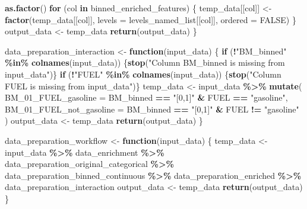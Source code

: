 \documentclass[
  english,
  11pt,
]{article}
\newenvironment{Shaded}{\begin{snugshade}}{\end{snugshade}}
\newcommand{\AttributeTok}[1]{\textcolor[rgb]{0.13,0.29,0.53}{#1}}
\newcommand{\ConstantTok}[1]{\textcolor[rgb]{0.56,0.35,0.01}{#1}}
\newcommand{\ControlFlowTok}[1]{\textcolor[rgb]{0.13,0.29,0.53}{\textbf{#1}}}
\newcommand{\FunctionTok}[1]{\textcolor[rgb]{0.13,0.29,0.53}{\textbf{#1}}}
\newcommand{\NormalTok}[1]{#1}
\newcommand{\OtherTok}[1]{\textcolor[rgb]{0.56,0.35,0.01}{#1}}
\newcommand{\SpecialCharTok}[1]{\textcolor[rgb]{0.81,0.36,0.00}{\textbf{#1}}}
\newcommand{\StringTok}[1]{\textcolor[rgb]{0.31,0.60,0.02}{#1}}
\begin{document}
\begin{Shaded}
\begin{Highlighting}[]
        \FunctionTok{as.factor}\NormalTok{()}
    \ControlFlowTok{for}\NormalTok{ (col }\ControlFlowTok{in}\NormalTok{ binned\_enriched\_features) \{}
\NormalTok{        temp\_data[[col]] }\OtherTok{\textless{}{-}} \FunctionTok{factor}\NormalTok{(temp\_data[[col]], }\AttributeTok{levels =}\NormalTok{ levels\_named\_list[[col]], }\AttributeTok{ordered =} \ConstantTok{FALSE}\NormalTok{)}
\NormalTok{    \}}
\NormalTok{    output\_data }\OtherTok{\textless{}{-}}\NormalTok{ temp\_data}
    \FunctionTok{return}\NormalTok{(output\_data)}
\NormalTok{\}}

\NormalTok{data\_preparation\_interaction }\OtherTok{\textless{}{-}} \ControlFlowTok{function}\NormalTok{(input\_data) \{}
    \ControlFlowTok{if}\NormalTok{ (}\SpecialCharTok{!}\StringTok{"BM\_binned"} \SpecialCharTok{\%in\%} \FunctionTok{colnames}\NormalTok{(input\_data)) \{}\FunctionTok{stop}\NormalTok{(}\StringTok{"Column BM\_binned is missing from input\_data"}\NormalTok{)\}}
    \ControlFlowTok{if}\NormalTok{ (}\SpecialCharTok{!}\StringTok{"FUEL"} \SpecialCharTok{\%in\%} \FunctionTok{colnames}\NormalTok{(input\_data)) \{}\FunctionTok{stop}\NormalTok{(}\StringTok{"Column FUEL is missing from input\_data"}\NormalTok{)\}}
\NormalTok{    temp\_data }\OtherTok{\textless{}{-}}\NormalTok{ input\_data }\SpecialCharTok{\%\textgreater{}\%}
        \FunctionTok{mutate}\NormalTok{(}
            \AttributeTok{BM\_01\_FUEL\_gasoline =}\NormalTok{ BM\_binned }\SpecialCharTok{==} \StringTok{"[0,1]"} \SpecialCharTok{\&}\NormalTok{ FUEL }\SpecialCharTok{==} \StringTok{"gasoline"}\NormalTok{,}
            \AttributeTok{BM\_01\_FUEL\_not\_gasoline =}\NormalTok{ BM\_binned }\SpecialCharTok{==} \StringTok{"[0,1]"} \SpecialCharTok{\&}\NormalTok{ FUEL }\SpecialCharTok{!=} \StringTok{"gasoline"}
\NormalTok{        )}
\NormalTok{    output\_data }\OtherTok{\textless{}{-}}\NormalTok{ temp\_data}
    \FunctionTok{return}\NormalTok{(output\_data)}
\NormalTok{\}}

\NormalTok{data\_preparation\_workflow }\OtherTok{\textless{}{-}} \ControlFlowTok{function}\NormalTok{(input\_data) \{}
\NormalTok{    temp\_data }\OtherTok{\textless{}{-}}\NormalTok{ input\_data }\SpecialCharTok{\%\textgreater{}\%}
\NormalTok{        data\_enrichment }\SpecialCharTok{\%\textgreater{}\%}
\NormalTok{        data\_preparation\_original\_categorical }\SpecialCharTok{\%\textgreater{}\%}
\NormalTok{        data\_preparation\_binned\_continuous }\SpecialCharTok{\%\textgreater{}\%}
\NormalTok{        data\_preparation\_enriched }\SpecialCharTok{\%\textgreater{}\%}
\NormalTok{        data\_preparation\_interaction}
\NormalTok{    output\_data }\OtherTok{\textless{}{-}}\NormalTok{ temp\_data}
    \FunctionTok{return}\NormalTok{(output\_data)}
\NormalTok{\}}
\end{Highlighting}
\end{Shaded}
\end{document}
